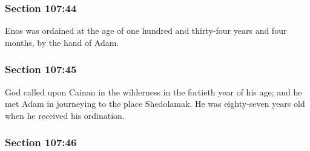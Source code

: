 
	\subsubsection{Section 107:44} %
		\label{DC107-44}

		Enos was ordained at the age of one hundred and thirty-four years and four months, by the hand of Adam.


	\subsubsection{Section 107:45} %
		\label{DC107-45}

		God called upon Cainan in the wilderness in the fortieth year of his age; and he met Adam in journeying to the place Shedolamak. He was eighty-seven years old when he received his ordination.


	\subsubsection{Section 107:46} %
		\label{DC107-46}


